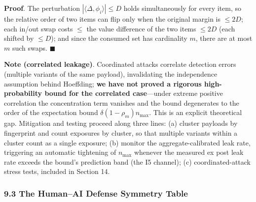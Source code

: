 \documentclass[
  11pt]{article}
\begin{document}
\textbf{Proof}. The perturbation
\(|\langle\Delta, \phi_i\rangle| \le D\) holds simultaneously for every
item, so the relative order of two items can flip only when the original
margin is \(\le 2D\); each in/out swap costs \(\le\) the value
difference of the two items \(\le 2D\) (each shifted by \(\le D\)); and
since the consumed set has cardinality \(m\), there are at most \(m\)
such swaps. \(\blacksquare\)

\textbf{Note (correlated leakage)}. Coordinated attacks correlate
detection errors (multiple variants of the same payload), invalidating
the independence assumption behind Hoeffding; \textbf{we have not proved
a rigorous high-probability bound for the correlated case}---under
extreme positive correlation the concentration term vanishes and the
bound degenerates to the order of the expectation bound
\(\delta(1-\rho_m)n_{\max}\). This is an explicit theoretical gap.
Mitigation and testing proceed along three lines: (a) cluster payloads
by fingerprint and count exposures by cluster, so that multiple variants
within a cluster count as a single exposure; (b) monitor the
aggregate-calibrated leak rate, triggering an automatic tightening of
\(n_{\max}\) whenever the measured ex post leak rate exceeds the bound's
prediction band (the I5 channel); (c) coordinated-attack stress tests,
included in Section 14.

\subsubsection{9.3 The Human--AI Defense Symmetry
Table}\label{the-humanai-defense-symmetry-table}
\end{document}
